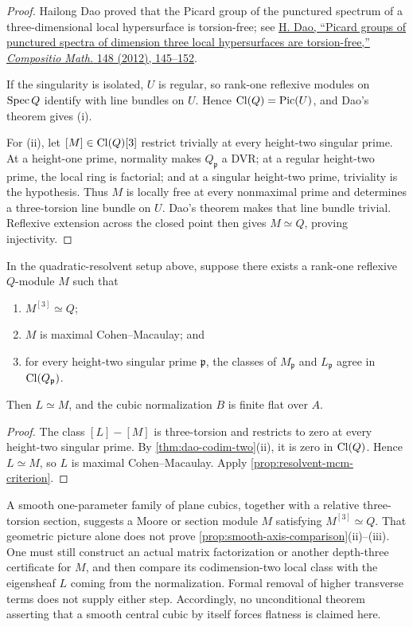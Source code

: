 \begin{proof}
Hailong Dao proved that the Picard group of the punctured spectrum of a
three-dimensional local hypersurface is torsion-free; see
\href{https://doi.org/10.1112/S0010437X11005513}{H. Dao, ``Picard groups of
punctured spectra of dimension three local hypersurfaces are torsion-free,''
\emph{Compositio Math.} 148 (2012), 145--152}.

If the singularity is isolated, \(U\) is regular, so rank-one reflexive
modules on \(\operatorname{Spec} Q\) identify with line bundles on \(U\).  Hence
\(\operatorname{Cl}(Q)=\operatorname{Pic}(U)\), and Dao's theorem gives (i).

For (ii), let \([M]\in\operatorname{Cl}(Q)[3]\) restrict trivially at every height-two
singular prime.  At a height-one prime, normality makes \(Q_{\mathfrak p}\) a
DVR; at a regular height-two prime, the local ring is factorial; and at a
singular height-two prime, triviality is the hypothesis.  Thus \(M\) is
locally free at every nonmaximal prime and determines a three-torsion line
bundle on \(U\).  Dao's theorem makes that line bundle trivial.  Reflexive
extension across the closed point then gives \(M\simeq Q\), proving
injectivity.
\end{proof}

\begin{proposition}
\label{prop:smooth-axis-comparison}
In the quadratic-resolvent setup above, suppose there exists a rank-one
reflexive \(Q\)-module \(M\) such that
\begin{enumerate}[label=(\roman*)]
\item \(M^{[3]}\simeq Q\);
\item \(M\) is maximal Cohen--Macaulay; and
\item for every height-two singular prime \(\mathfrak p\), the classes of
\(M_{\mathfrak p}\) and \(L_{\mathfrak p}\) agree in
\(\operatorname{Cl}(Q_{\mathfrak p})\).
\end{enumerate}
Then \(L\simeq M\), and the cubic normalization \(B\) is finite flat over
\(A\).
\end{proposition}

\begin{proof}
The class \([L]-[M]\) is three-torsion and restricts to zero at every
height-two singular prime.  By \cref{thm:dao-codim-two}(ii), it is zero in
\(\operatorname{Cl}(Q)\).  Hence \(L\simeq M\), so \(L\) is maximal Cohen--Macaulay.
Apply \cref{prop:resolvent-mcm-criterion}.
\end{proof}

\begin{remark}
A smooth one-parameter family of plane cubics, together with a relative
three-torsion section, suggests a Moore or section module \(M\) satisfying
\(M^{[3]}\simeq Q\).  That geometric picture alone does not prove
\cref{prop:smooth-axis-comparison}(ii)--(iii).  One must still construct an
actual matrix factorization or another depth-three certificate for \(M\), and
then compare its codimension-two local class with the eigensheaf \(L\) coming
from the normalization.  Formal removal of higher transverse terms does not
supply either step.  Accordingly, no unconditional theorem asserting that a
smooth central cubic by itself forces flatness is claimed here.
\end{remark}

